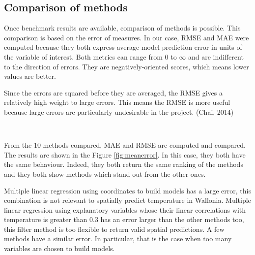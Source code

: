 \documentclass[12pt,twoside]{reedthesis}
\theoremstyle{definition}
\theoremstyle{definition}
\theoremstyle{definition}
\theoremstyle{remark}
\begin{document}
\subsection{Comparison of methods}\label{comparison-of-methods}

Once benchmark results are available, comparison of methods is possible.
This comparison is based on the error of measures. In our case, RMSE and
MAE were computed because they both express average model prediction
error in units of the variable of interest. Both metrics can range from
0 to \(\infty\) and are indifferent to the direction of errors. They are
negatively-oriented scores, which means lower values are better.

Since the errors are squared before they are averaged, the RMSE gives a
relatively high weight to large errors. This means the RMSE is more
useful because large errors are particularly undesirable in the project.
(Chai, 2014)

~

From the 10 methods compared, MAE and RMSE are computed and compared.
The results are shown in the Figure \ref{fig:meanerror}. In this case,
they both have the same behaviour. Indeed, they both return the same
ranking of the methods and they both show methods which stand out from
the other ones.

Multiple linear regression using coordinates to build models has a large
error, this combination is not relevant to spatially predict temperature
in Wallonia. Multiple linear regression using explanatory variables
whose their linear correlations with temperature is greater than 0.3 has
an error larger than the other methods too, this filter method is too
flexible to return valid spatial predictions. A few methods have a
similar error. In particular, that is the case when too many variables
are chosen to build models.

~
\end{document}
